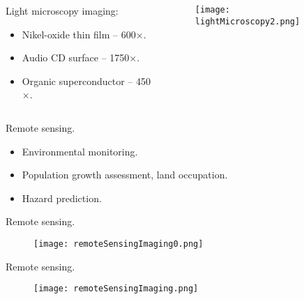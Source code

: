 
\begin{frame}
\begin{columns}
\begin{column}{.48\textwidth}
Light microscopy imaging:
\begin{itemize}
\item Nikel-oxide thin film -- 600$\times$.
\item Audio CD surface -- 1750$\times$.
\item Organic superconductor -- 450$\times$.
\end{itemize}
\end{column}
\begin{column}{.48\textwidth}
\begin{figure}
\texttt{[image: lightMicroscopy2.png]}
\end{figure}
\end{column}
\end{columns}
\end{frame}


\begin{frame}
Remote sensing.
\begin{itemize}
\item Environmental monitoring.
\item Population growth assessment, land occupation.
\item Hazard prediction.
\end{itemize}
\end{frame}


\begin{frame}
Remote sensing.
\begin{figure}
\texttt{[image: remoteSensingImaging0.png]}
\end{figure}
\end{frame}


\begin{frame}
Remote sensing.
\begin{figure}
\texttt{[image: remoteSensingImaging.png]}
\end{figure}
\end{frame}

